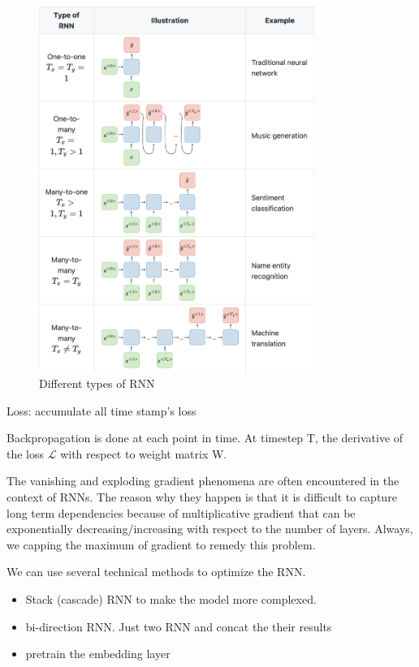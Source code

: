 \documentclass[UTF8]{article}
\begin{document}
\begin{figure}[htbp]
\caption{Different types of RNN}
\centering
\includegraphics[width=0.8\textwidth]{stanford.edu__shervine_teaching_cs-230_cheatsheet-recurrent-neural-networks.png}
\end{figure}

Loss: accumulate all time stamp's loss

Backpropagation is done at each point in time. At timestep T, the derivative of the loss $\mathcal{L}$ with respect to weight matrix W.

The vanishing and exploding gradient phenomena are often encountered in the context of RNNs. The reason why they happen is that it is difficult to capture long term dependencies because of multiplicative gradient that can be exponentially decreasing/increasing with respect to the number of layers. Always, we capping the maximum of gradient to remedy this problem.

We can use several technical methods to optimize the RNN. 
\begin{itemize}
    \item Stack (cascade) RNN to make the model more complexed.
    \item bi-direction RNN. Just two RNN and concat the their results
    \item pretrain the embedding layer
\end{itemize}
\end{document}
